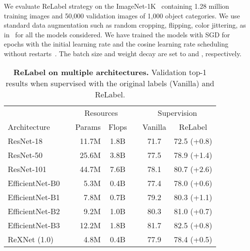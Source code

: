 \documentclass[final]{cvpr}
\newcommand\ours{{{\mbox{ReLabel}}}\xspace}
\begin{document}
We evaluate \ours strategy on the ImageNet-1K~\cite{ImageNet} containing 1.28 million training images and 50,000 validation images of 1,000 object categories. 
We use standard data augmentation such as random cropping, flipping, color jittering, as in~\cite{pyramidnet,ghiasi2018dropblock,densenet,GoogleNet,yun2019cutmix,touvron2019fixing} for all the models considered.
We have trained the models with SGD for  epochs with the initial learning rate  and the cosine learning rate scheduling without restarts~\cite{loshchilov2016sgdr}. The batch size and weight decay are set to  and , respectively. 



\begin{table}
\vspace{-0.2cm}
\centering
\tabcolsep=0.13cm
\begin{tabular}{@{}lrrcccc@{}}
\toprule
   && \multicolumn{2}{c}{Resources}    && \multicolumn{2}{c}{Supervision}  \\ 
Architecture       && Params & Flops    && Vanilla & \ours \\ \midrule
ResNet-18 && 11.7M& 1.8B && 71.7 & 72.5 (+0.8)\\
ResNet-50 && 25.6M & 3.8B && 77.5 & 78.9 (+1.4)\\
ResNet-101 && 44.7M& 7.6B && 78.1 & 80.7 (+2.6) \\
\midrule
EfficientNet-B0 && 5.3M & 0.4B  && 77.4 & 78.0 (+0.6) \\
EfficientNet-B1 && 7.8M & 0.7B  && 79.2 & 80.3 (+1.1) \\
EfficientNet-B2 && 9.2M & 1.0B  && 80.3 & 81.0 (+0.7) \\
EfficientNet-B3 && 12.2M & 1.8B && 81.7 & 82.5 (+0.8) \\
\midrule
ReXNet (1.0) && 4.8M & 0.4B  && 77.9 & 78.4 (+0.5) \\
\bottomrule
\end{tabular}
\caption{\textbf{\ours on multiple architectures.} Validation top-1 results when supervised with the original labels (Vanilla) and \ours.}
\label{table:imagenet_various_arch}
\vspace{-0.2cm}
\end{table}
 
\end{document}
